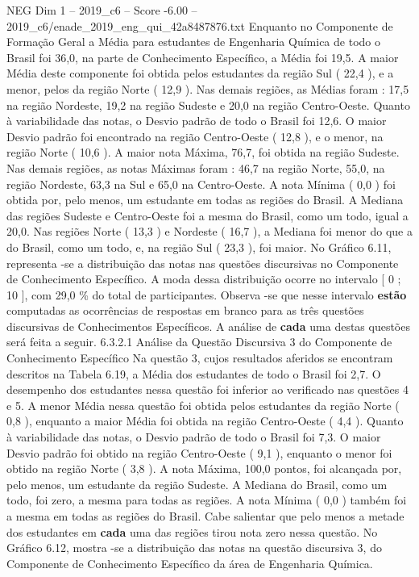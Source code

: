 \begin{textsample}{NEG Dim 1 – 2019\_c6 – Score -6.00 – 2019\_c6/enade\_2019\_eng\_qui\_42a8487876.txt}
Enquanto no Componente de Formação Geral a Média para estudantes de Engenharia Química de todo o Brasil foi 36,0, na parte de Conhecimento Específico, a Média foi 19,5.
A maior Média deste componente foi obtida pelos estudantes da região Sul ( 22,4 ), e a menor, pelos da região Norte ( 12,9 ).
Nas demais regiões, as Médias foram : 17,5 na região Nordeste, 19,2 na região Sudeste e 20,0 na região Centro-Oeste.
Quanto à variabilidade das notas, o Desvio padrão de todo o Brasil foi 12,6.
O maior Desvio padrão foi encontrado na região Centro-Oeste ( 12,8 ), e o menor, na região Norte ( 10,6 ).
A maior nota Máxima, 76,7, foi obtida na região Sudeste.
Nas demais regiões, as notas Máximas foram : 46,7 na região Norte, 55,0, na região Nordeste, 63,3 na Sul e 65,0 na Centro-Oeste.
A nota Mínima ( 0,0 ) foi obtida por, pelo menos, um estudante em todas as regiões do Brasil.
A Mediana das regiões Sudeste e Centro-Oeste foi a mesma do Brasil, como um todo, igual a 20,0.
Nas regiões Norte ( 13,3 ) e Nordeste ( 16,7 ), a Mediana foi menor do que a do Brasil, como um todo, e, na região Sul ( 23,3 ), foi maior.
No Gráfico 6.11, representa -se a distribuição das notas nas questões discursivas no Componente de Conhecimento Específico.
A moda dessa distribuição ocorre no intervalo [ 0 ; 10 ], com 29,0 \% do total de participantes.
Observa -se que nesse intervalo \textbf{estão} computadas as ocorrências de respostas em branco para as três questões discursivas de Conhecimentos Específicos.
A análise de \textbf{cada} uma destas questões será feita a seguir. 6.3.2.1 Análise da Questão Discursiva 3 do Componente de Conhecimento Específico Na questão 3, cujos resultados aferidos se encontram descritos na Tabela 6.19, a Média dos estudantes de todo o Brasil foi 2,7.
O desempenho dos estudantes nessa questão foi inferior ao verificado nas questões 4 e 5.
A menor Média nessa questão foi obtida pelos estudantes da região Norte ( 0,8 ), enquanto a maior Média foi obtida na região Centro-Oeste ( 4,4 ).
Quanto à variabilidade das notas, o Desvio padrão de todo o Brasil foi 7,3.
O maior Desvio padrão foi obtido na região Centro-Oeste ( 9,1 ), enquanto o menor foi obtido na região Norte ( 3,8 ).
A nota Máxima, 100,0 pontos, foi alcançada por, pelo menos, um estudante da região Sudeste.
A Mediana do Brasil, como um todo, foi zero, a mesma para todas as regiões.
A nota Mínima ( 0,0 ) também foi a mesma em todas as regiões do Brasil.
Cabe salientar que pelo menos a metade dos estudantes em \textbf{cada} uma das regiões tirou nota zero nessa questão.
No Gráfico 6.12, mostra -se a distribuição das notas na questão discursiva 3, do Componente de Conhecimento Específico da área de Engenharia Química.

\end{textsample}
